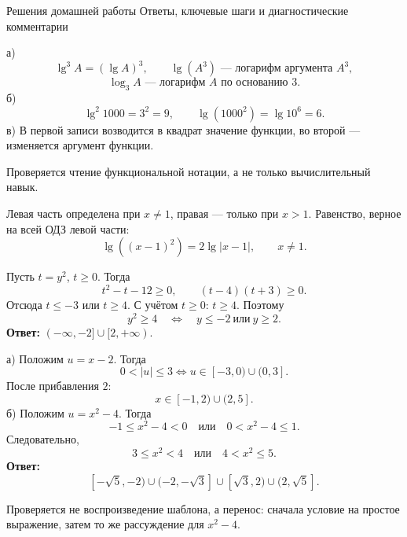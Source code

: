 \newpage
\homeworktitle
  {Решения домашней работы}
  {Ответы, ключевые шаги и диагностические комментарии}

\begin{teacheranswer}[Задание 1]
  а)
  \[
    \lg^3 A=(\lg A)^3,
    \qquad
    \lg(A^3)\text{ — логарифм аргумента }A^3,
  \]
  \[
    \log_3 A\text{ — логарифм }A\text{ по основанию }3.
  \]
  б)
  \[
    \lg^2 1000=3^2=9,
    \qquad
    \lg(1000^2)=\lg10^6=6.
  \]
  в) В первой записи возводится в квадрат значение функции, во второй —
  изменяется аргумент функции.
\end{teacheranswer}

\begin{criterionbox}
  Проверяется чтение функциональной нотации, а не только вычислительный навык.
\end{criterionbox}

\begin{teacheranswer}[Задание 2]
  Левая часть определена при \(x\ne1\), правая — только при \(x>1\).
  Равенство, верное на всей ОДЗ левой части:
  \[
    \lg((x-1)^2)=2\lg|x-1|,
    \qquad x\ne1.
  \]
\end{teacheranswer}

\begin{teacheranswer}[Задание 3]
  Пусть \(t=y^2\), \(t\ge0\). Тогда
  \[
    t^2-t-12\ge0,
    \qquad
    (t-4)(t+3)\ge0.
  \]
  Отсюда \(t\le-3\) или \(t\ge4\). С учётом \(t\ge0\): \(t\ge4\).
  Поэтому
  \[
    y^2\ge4
    \quad\Longleftrightarrow\quad
    y\le-2\ \text{или}\ y\ge2.
  \]
  \textbf{Ответ:} \(( -\infty,-2]\cup[2,+\infty)\).
\end{teacheranswer}

\begin{teacheranswer}[Задание 4]
  а) Положим \(u=x-2\). Тогда
  \[
    0<|u|\le3
    \Longleftrightarrow
    u\in[-3,0)\cup(0,3].
  \]
  После прибавления \(2\):
  \[
    x\in[-1,2)\cup(2,5].
  \]
  б) Положим \(u=x^2-4\). Тогда
  \[
    -1\le x^2-4<0
    \quad\text{или}\quad
    0<x^2-4\le1.
  \]
  Следовательно,
  \[
    3\le x^2<4
    \quad\text{или}\quad
    4<x^2\le5.
  \]
  \textbf{Ответ:}
  \[
    [-\sqrt5,-2)\cup(-2,-\sqrt3]
    \cup[\sqrt3,2)\cup(2,\sqrt5].
  \]
\end{teacheranswer}

\begin{criterionbox}
  Проверяется не воспроизведение шаблона, а перенос: сначала условие на
  простое выражение, затем то же рассуждение для \(x^2-4\).
\end{criterionbox}

